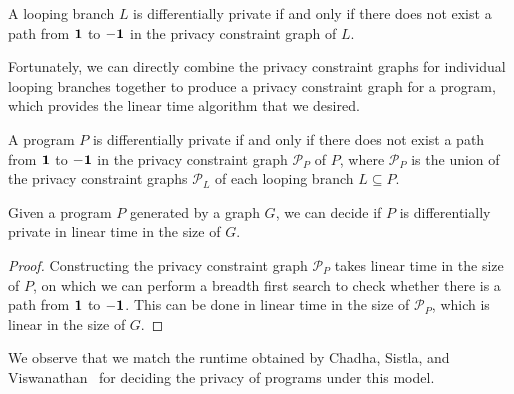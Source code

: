 \begin{prop}\label{privacyConstraintGraphProp}
    A looping branch $L$ is differentially private if and only if there does not exist a path from $\bf 1$ to $\bf -1$ in the privacy constraint graph of $L$.
\end{prop}

Fortunately, we can directly combine the privacy constraint graphs for individual looping branches together to produce a privacy constraint graph for a program, which provides the linear time algorithm that we desired.

\begin{prop}\label{programPrivacyConstraintGraphPathReq}
    A program $P$ is differentially private if and only if there does not exist a path from $\bf 1$ to $\bf -1$ in the privacy constraint graph $\mathcal{P}_P$ of $P$, where $\mathcal{P}_P$ is the union of the privacy constraint graphs $\mathcal{P}_L$ of each looping branch $L\subseteq P$.
\end{prop}

\begin{thm}\label{LinearTimeDecidingPrograms}
    Given a program $P$ generated by a graph $G$, we can decide if $P$ is differentially private in linear time in the size of $G$.
\end{thm}

\begin{proof}
    Constructing the privacy constraint graph $\mathcal{P}_P$ takes linear time in the size of $P$, on which we can perform a breadth first search to check whether there is a path from $\bf 1$ to $\bf -1$. This can be done in linear time in the size of $\mathcal{P}_P$, which is linear in the size of $G$.
\end{proof}

We observe that we match the runtime obtained by Chadha, Sistla, and Viswanathan~\cite{chadhaLinearTimeDecidability2021} for deciding the privacy of programs under this model. 


